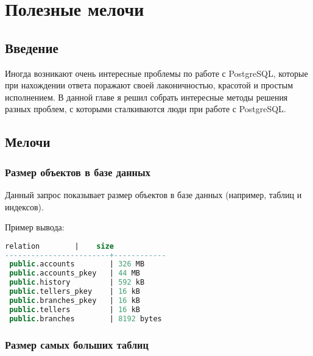 \chapter{Полезные мелочи}

\begin{epigraphs}
\end{epigraphs}

\section{Введение}

Иногда возникают очень интересные проблемы по работе с PostgreSQL, которые при нахождении ответа поражают своей лаконичностью, красотой и простым исполнением. В данной главе я решил собрать интересные методы решения разных проблем, с которыми сталкиваются люди при работе с PostgreSQL.


\section{Мелочи}


\subsection{Размер объектов в базе данных}

Данный запрос показывает размер объектов в базе данных (например, таблиц и индексов).



Пример вывода:

\begin{lstlisting}[language=SQL,label=lst:snippets2,caption=Поиск самых больших объектов в БД. Пример вывода]
        relation        |    size
------------------------+------------
 public.accounts        | 326 MB
 public.accounts_pkey   | 44 MB
 public.history         | 592 kB
 public.tellers_pkey    | 16 kB
 public.branches_pkey   | 16 kB
 public.tellers         | 16 kB
 public.branches        | 8192 bytes
\end{lstlisting}


\subsection{Размер самых больших таблиц}

